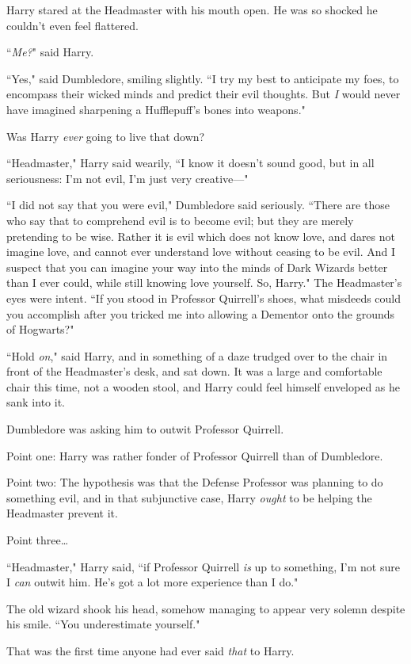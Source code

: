 Harry stared at the Headmaster with his mouth open. He was so shocked he couldn't even feel flattered.

``\emph{Me?}" said Harry.

``Yes," said Dumbledore, smiling slightly. ``I try my best to anticipate my foes, to encompass their wicked minds and predict their evil thoughts. But \emph{I} would never have imagined sharpening a Hufflepuff's bones into weapons."

Was Harry \emph{ever} going to live that down?

``Headmaster," Harry said wearily, ``I know it doesn't sound good, but in all seriousness: I'm not evil, I'm just very creative—"

``I did not say that you were evil," Dumbledore said seriously. ``There are those who say that to comprehend evil is to become evil; but they are merely pretending to be wise. Rather it is evil which does not know love, and dares not imagine love, and cannot ever understand love without ceasing to be evil. And I suspect that you can imagine your way into the minds of Dark Wizards better than I ever could, while still knowing love yourself. So, Harry." The Headmaster's eyes were intent. ``If you stood in Professor Quirrell's shoes, what misdeeds could you accomplish after you tricked me into allowing a Dementor onto the grounds of Hogwarts?"

``Hold \emph{on}," said Harry, and in something of a daze trudged over to the chair in front of the Headmaster's desk, and sat down. It was a large and comfortable chair this time, not a wooden stool, and Harry could feel himself enveloped as he sank into it.

Dumbledore was asking him to outwit Professor Quirrell.

Point one: Harry was rather fonder of Professor Quirrell than of Dumbledore.

Point two: The hypothesis was that the Defense Professor was planning to do something evil, and in that subjunctive case, Harry \emph{ought} to be helping the Headmaster prevent it.

Point three{\ldots}

``Headmaster," Harry said, ``if Professor Quirrell \emph{is} up to something, I'm not sure I \emph{can} outwit him. He's got a lot more experience than I do."

The old wizard shook his head, somehow managing to appear very solemn despite his smile. ``You underestimate yourself."

That was the first time anyone had ever said \emph{that} to Harry.

